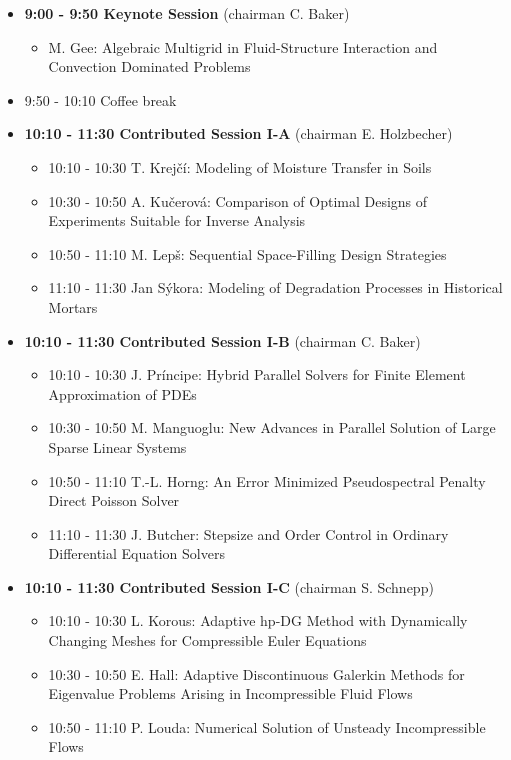 \documentclass[10pt, A4]{article}%
\begin{document}
\begin{itemize}    
  \item {\bf 9:00 - 9:50 Keynote Session} (chairman C. Baker) 
  \begin{itemize}
    \item M. Gee: Algebraic Multigrid in Fluid-Structure Interaction and Convection Dominated Problems
  \end{itemize}
  \item 9:50 - 10:10 Coffee break
  \item {\bf 10:10 - 11:30 Contributed Session I-A} (chairman E. Holzbecher) 
  \begin{itemize}
    \item 10:10 - 10:30 T. Krej\v{c}\'{i}: Modeling of Moisture Transfer in Soils
    \item 10:30 - 10:50 A. Ku\v{c}erov\'{a}: Comparison of Optimal Designs of Experiments Suitable for Inverse Analysis
    \item 10:50 - 11:10 M. Lep\v{s}: Sequential Space-Filling Design Strategies
    \item 11:10 - 11:30 Jan S\'{y}kora: Modeling of Degradation Processes in Historical Mortars
  \end{itemize}
  \item {\bf 10:10 - 11:30 Contributed Session I-B} (chairman C. Baker) 
  \begin{itemize}
    \item 10:10 - 10:30 J. Pr\'{i}ncipe: Hybrid Parallel Solvers for Finite Element Approximation of PDEs
    \item 10:30 - 10:50 M. Manguoglu: New Advances in Parallel Solution of Large Sparse Linear Systems
    \item 10:50 - 11:10 T.-L. Horng: An Error Minimized Pseudospectral Penalty Direct Poisson Solver
    \item 11:10 - 11:30 J. Butcher: Stepsize and Order Control in Ordinary Differential Equation Solvers
  \end{itemize}
  \item {\bf 10:10 - 11:30 Contributed Session I-C} (chairman S. Schnepp) 
  \begin{itemize}
    \item 10:10 - 10:30 L. Korous: Adaptive hp-DG Method with Dynamically Changing Meshes for Compressible Euler Equations
    \item 10:30 - 10:50 E. Hall: Adaptive Discontinuous Galerkin Methods for Eigenvalue Problems Arising in Incompressible Fluid Flows
    \item 10:50 - 11:10 P. Louda: Numerical Solution of Unsteady Incompressible Flows

\end{itemize}
\end{itemize}
\end{document}
